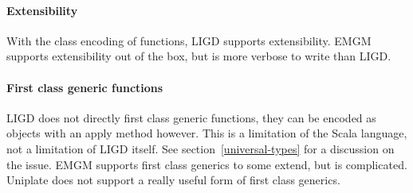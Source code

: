 \paragraph{Extensibility}
With the class encoding of functions, LIGD supports
extensibility. EMGM supports extensibility out of the box, but is more verbose
to write than LIGD. 

\paragraph{First class generic functions}
LIGD does not directly first class generic functions, they can be encoded as
objects with an apply method however. This is a limitation of the Scala
language, not a limitation of LIGD itself. See section~\ref{universal-types}
for a discussion on the issue. EMGM supports first class generics to some
extend, but is complicated. Uniplate does not support a really useful form
of first class generics. 
